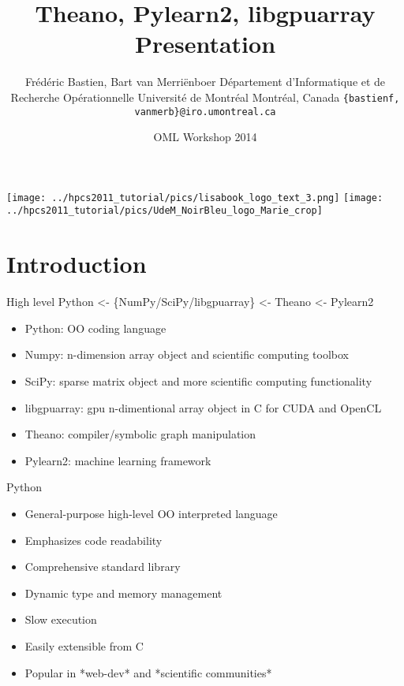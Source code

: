 \documentclass[utf8x,xcolor=pdftex,dvipsnames,table]{beamer}
\title{Theano, Pylearn2, libgpuarray Presentation}
\author{
\footnotesize
Frédéric Bastien\superscript{a}, Bart van Merriënboer\superscript{a} \newline
\superscript{a}Département d'Informatique et de Recherche Opérationnelle \newline
Université de Montréal \newline
Montréal, Canada \newline
\texttt{\{bastienf, vanmerb\}@iro.umontreal.ca} \newline \newline
}
\date{OML Workshop 2014}
\begin{document}
\begin{frame}[plain]
 \titlepage
 \vspace{-5em}
 \texttt{[image: ../hpcs2011\_tutorial/pics/lisabook\_logo\_text\_3.png]}
 \hfill
 \texttt{[image: ../hpcs2011\_tutorial/pics/UdeM\_NoirBleu\_logo\_Marie\_crop]}
\end{frame}

\section{Introduction}
\begin{frame}{High level}\setcounter{page}{1}
  Python <- \{NumPy/SciPy/libgpuarray\} <- Theano <- Pylearn2
  \begin{itemize}
  \item Python: OO coding language
  \item Numpy: n-dimension array object and scientific computing toolbox
  \item SciPy: sparse matrix object and more scientific computing functionality
  \item libgpuarray: gpu n-dimentional array object in C for CUDA and OpenCL
  \item Theano: compiler/symbolic graph manipulation
  \item Pylearn2: machine learning framework
  \end{itemize}
\end{frame}

\begin{frame}{Python}
  \begin{itemize}
  \item General-purpose high-level OO interpreted language
  \item Emphasizes code readability
  \item Comprehensive standard library
  \item Dynamic type and memory management
  \item Slow execution
  \item Easily extensible from C
  \item Popular in *web-dev* and *scientific communities*
  \end{itemize}
\end{frame}
\end{document}
